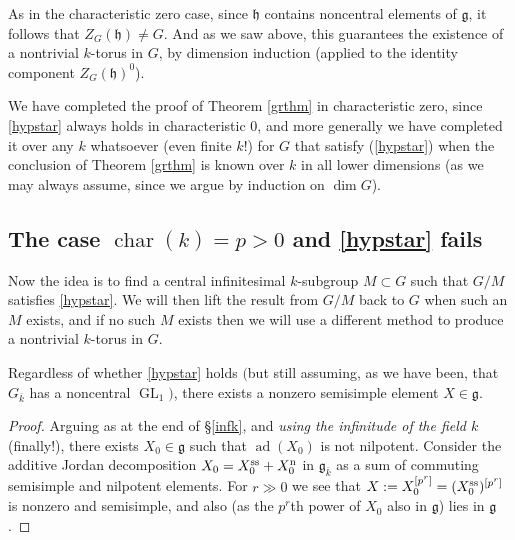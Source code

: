\documentclass[10pt]{article}
\renewcommand{\(}{\left(}
\renewcommand{\)}{\right)}
\numberwithin{thm}{subsection}
\begin{document}
As in the characteristic zero case, since $\mathfrak{h}$ contains noncentral elements of $\mathfrak{g}$, it follows
that $Z_G(\mathfrak{h}) \ne G$. 
And as we saw above, this guarantees the existence of a nontrivial $k$-torus
in $G$, by dimension induction (applied to the identity component $Z_G(\mathfrak{h})^0$). 

We have completed the proof of Theorem \ref{grthm} in characteristic zero,
since \eqref{hypstar} always holds in characteristic 0,
and more generally we have completed it over any $k$ whatsoever (even finite $k$!)
for $G$ that satisfy (\ref{hypstar})  when
the conclusion of Theorem \ref{grthm} is known over $k$ in all lower dimensions
(as we may always assume, since we argue by induction on $\dim G$). 

\subsection{The case $\operatorname{char}(k)=p>0$ and \eqref{hypstar} fails}\label{fail}

Now the idea is to find a central infinitesimal $k$-subgroup $M\subset G$
such that $G/M$ satisfies \eqref{hypstar}.  We will then lift the result from $G/M$
back to $G$ when such an
$M$ exists, and if no such $M$ exists
then we will use a different method to produce a nontrivial $k$-torus in $G$.

\begin{lemma}\label{ssexist}
Regardless of whether \eqref{hypstar} holds $($but still
assuming, as we have been, that $G_{\overline{k}}$ has a noncentral $\operatorname{GL}_1$$)$,
there exists a nonzero semisimple element $X\in \mathfrak{g}$.
\end{lemma}
\begin{proof}
 Arguing as at the end of \S\ref{infk}, 
 and \textit{using the infinitude of the field $k$} (finally!), 
 there exists $X_0\in \mathfrak{g}$ such that $\operatorname{ad}(X_0)$ is not nilpotent.
Consider the additive Jordan decomposition
$X_0=X_0^{\rm{ss}}+X_0^{\rm{n}}$ in $\mathfrak{g}_{\overline{k}}$ 
as a sum of commuting semisimple and nilpotent elements. 
For $r \gg 0$
we see that
$X:=X_0^{[p^r]}=(X_0^{\rm{ss}})^{[p^r]}$
is nonzero and semisimple, and also (as the $p^r$th power
of $X_0$ also in $\mathfrak{g}$) lies in $\mathfrak{g}$.
\end{proof}
\end{document}
